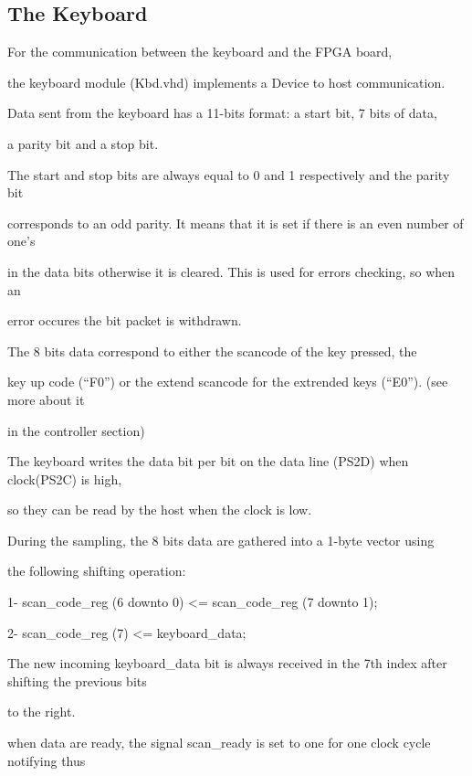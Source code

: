 \documentclass[conference]{IEEEtran}
\begin{document}
\subsection{The Keyboard}
For the communication between the keyboard and the FPGA board,

the keyboard module (Kbd.vhd) implements a Device to host communication.

Data sent from the keyboard has a 11-bits format: a start bit, 7 bits of data,

a parity bit and a stop bit.



The start and stop bits are always equal to 0 and 1 respectively and the parity bit

corresponds to an odd parity. It means that it is set if there is an even number of one's

in the data bits otherwise it is cleared. This is used for errors checking, so when an

error occures the bit packet is withdrawn.



The 8 bits data correspond to either the scancode of the key pressed, the

key up code (``F0'') or the extend scancode for the extrended keys (``E0''). (see more about it

in the controller section)



The keyboard writes the data bit per bit on the data line (PS2D) when clock(PS2C) is high,

so they can be read by the host when the clock is low.



During the sampling, the 8 bits data are gathered into a 1-byte vector using

the following shifting operation:



1-  scan_code_reg (6 downto 0) <= scan_code_reg (7 downto 1);

2-  scan_code_reg (7)          <= keyboard_data;



The new incoming keyboard_data bit is always received in the 7th index after shifting the previous bits

to the right.



when data are ready, the signal scan_ready is set to one for one clock cycle notifying thus
\end{document}
